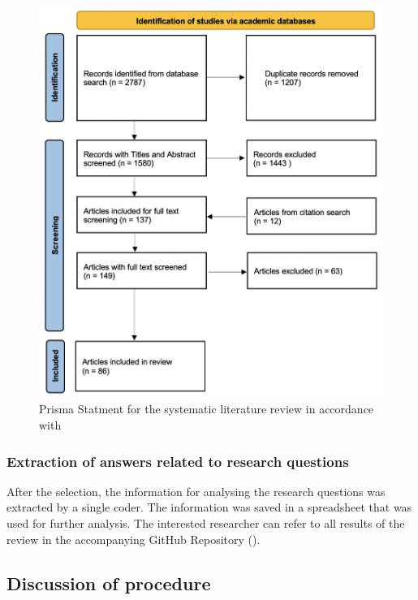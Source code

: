 \begin{figure}
    \centering
    \includegraphics[width=\textwidth]{reports/figures/prisma_statement.png}
    \caption{Prisma Statment for the systematic literature review in accordance with \cite{page_prisma_2021}}
    \label{fig: Prisma Statement}
\end{figure}

\subsubsection{Extraction of answers related to research questions}

After the selection, the information for analysing the research questions was extracted by a single coder. The information was saved in a spreadsheet that was used for further analysis. The interested researcher can refer to all results of the review in the accompanying GitHub Repository (\cite{langenbahn_smartphone_2021}).


\subsection{Discussion of procedure}

